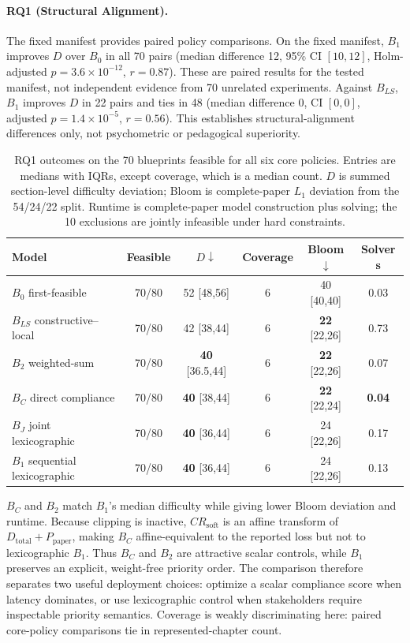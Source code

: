 \documentclass[runningheads]{llncs}
\begin{document}
\paragraph{RQ1 (Structural Alignment).}
The fixed manifest provides paired policy comparisons. On the fixed manifest, $B_1$ improves $D$ over $B_0$ in all 70 pairs (median difference 12, 95\% CI $[10,12]$, Holm-adjusted $p=3.6{\times}10^{-12}$, $r=0.87$). These are paired results for the tested manifest, not independent evidence from 70 unrelated experiments. Against $B_{LS}$, $B_1$ improves $D$ in 22 pairs and ties in 48 (median difference 0, CI $[0,0]$, adjusted $p=1.4{\times}10^{-5}$, $r=0.56$). This establishes structural-alignment differences only, not psychometric or pedagogical superiority.
\begin{table}[t]
\caption{RQ1 outcomes on the 70 blueprints feasible for all six core policies. Entries are medians with IQRs, except coverage, which is a median count. $D$ is summed section-level difficulty deviation; Bloom is complete-paper $L_1$ deviation from the 54/24/22 split. Runtime is complete-paper model construction plus solving; the 10 exclusions are jointly infeasible under hard constraints.}
\label{tab:rq1}
\centering
\small
\begin{tabular}{@{}lccccc@{}}
\toprule
\textbf{Model} & \textbf{Feasible} & $D\downarrow$ & \textbf{Coverage} & \textbf{Bloom}$\downarrow$ & \textbf{Solver s} \\
\midrule
$B_0$ first-feasible        & 70/80 & 52 [48,56] & 6 & 40 [40,40] & 0.03 \\
$B_{LS}$ constructive--local & 70/80 & 42 [38,44] & 6 & \textbf{22} [22,26] & 0.73 \\
$B_2$ weighted-sum          & 70/80 & \textbf{40} [36.5,44] & 6 & \textbf{22} [22,26] & 0.07 \\
$B_C$ direct compliance    & 70/80 & \textbf{40} [38,44] & 6 & \textbf{22} [22,24] & \textbf{0.04} \\
$B_J$ joint lexicographic  & 70/80 & \textbf{40} [36,44] & 6 & 24 [22,26] & 0.17 \\
$B_1$ sequential lexicographic & 70/80 & \textbf{40} [36,44] & 6 & 24 [22,26] & 0.13 \\
\bottomrule
\end{tabular}
\end{table}
$B_C$ and $B_2$ match $B_1$'s median difficulty while giving lower Bloom deviation and runtime. Because clipping is inactive, $CR_{\mathrm{soft}}$ is an affine transform of $D_{\mathrm{total}}+P_{\mathrm{paper}}$, making $B_C$ affine-equivalent to the reported loss but not to lexicographic $B_1$. Thus $B_C$ and $B_2$ are attractive scalar controls, while $B_1$ preserves an explicit, weight-free priority order. The comparison therefore separates two useful deployment choices: optimize a scalar compliance score when latency dominates, or use lexicographic control when stakeholders require inspectable priority semantics. Coverage is weakly discriminating here: paired core-policy comparisons tie in represented-chapter count.
\end{document}

